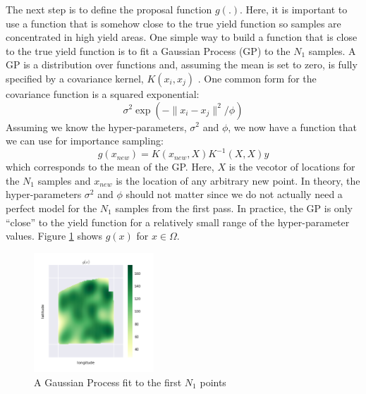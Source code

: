 \documentclass{article} %
\begin{document}

The next step is to define the proposal function $g(.)$. Here, it is important to use a function that is somehow close to the true yield function so samples are concentrated in high yield areas. One simple way to build a function that is close to the true yield function is to fit a Gaussian Process (GP) to the $N_1$ samples. A GP is a distribution over functions and, assuming the mean is set to zero, is fully specified by a covariance kernel, $K(x_i, x_j)$ \cite{rasmussen}. One common form for the covariance function is a squared exponential: $$\sigma^2 \exp{\left(-\|x_i - x_j\|^2 / \phi\right)}$$ Assuming we know the hyper-parameters, $\sigma^2$ and $\phi$, we now have a function that we can use for importance sampling: $$g(x_{new}) = K(x_{new}, X)K^{-1}(X,X)y$$ which corresponds to the mean of the GP. Here, $X$ is the vecotor of locations for the $N_1$ samples and $x_{new}$ is the location of any arbitrary new point. In theory, the hyper-parameters $\sigma^2$ and $\phi$ should not matter since we do not actually need a perfect model for the $N_1$ samples from the first pass. In practice, the GP is only ``close'' to the yield function for a relatively small range of the hyper-parameter values. Figure \ref{fig:gpfit} shows $g(x)$ for $x \in \Omega$.

\begin{figure}
\begin{center}
\includegraphics[width=0.4\textwidth]{figures/gp}
\caption{A Gaussian Process fit to the first $N_1$ points}%
\label{fig:gpfit}
\end{center}
\end{figure}
\end{document}
